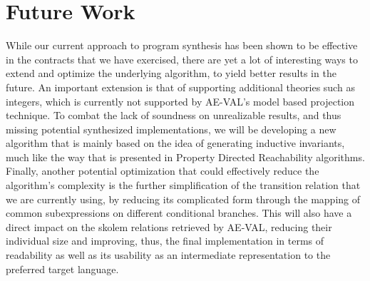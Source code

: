 \section{Future Work}

While our current approach to program synthesis has been shown to be effective
in the contracts that we have exercised, there are yet a lot of interesting ways
to extend and optimize the underlying algorithm, to yield better results in the
future. An important extension is that of supporting additional theories such as
integers, which is currently not supported by AE-VAL's model based projection
technique. To combat the lack of soundness on unrealizable results, and thus
missing potential synthesized implementations, we will be developing a new
algorithm that is mainly based on the idea of generating inductive invariants,
much like the way that is presented in Property Directed Reachability
algorithms. Finally, another potential optimization that could effectively
reduce the algorithm's complexity is the further simplification of the
transition relation that we are currently using, by reducing its complicated
form through the mapping of common subexpressions on different conditional
branches. This will also have a direct impact on the skolem relations retrieved
by AE-VAL, reducing their individual size and improving, thus, the final
implementation in terms of readability as well as its usability as an
intermediate representation to the preferred target language.


\label{sec:futurework}
